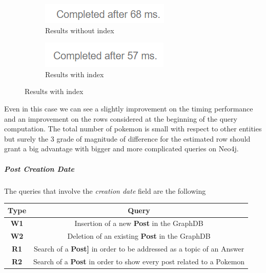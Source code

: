 \begin{figure}[H]
\begin{subfigure}{0.5\textwidth}
	\end{subfigure}
\end{figure}
\begin{figure}[H]
	\begin{subfigure}{0.5\textwidth}
		\includegraphics[width=0.9\linewidth]{img/pokemon_without_index_2.png} 
		\caption{Results without index}
	\end{subfigure}
	\begin{subfigure}{0.5\textwidth}
		\includegraphics[width=0.9\linewidth]{img/pokemon_with_index_2.png}
		\caption{Results with index}
	\end{subfigure}
\end{figure}

Even in this case we can see a slightly improvement on the timing performance and an improvement on the rows considered at the beginning of the query computation. The total number of pokemon is small with respect to other entities but surely the 3 grade of magnitude of difference for the estimated row should grant a big advantage with bigger and more complicated queries on Neo4j.
\subparagraph{Post Creation Date}
The queries that involve the \textit{creation date} field are the following

\begin{center}
	\begin{tabular}{| c | c |} 
		\hline
		\textbf{Type} & \textbf{Query} \\ [0.5ex] 
		\hline
		\textbf{W1} & Insertion of a new \textbf{Post} in the GraphDB\\ 
		\hline
		\textbf{W2} & Deletion of an existing \textbf{Post} in the GraphDB \\
		\hline
		\textbf{R1} & Search of a \textbf{Post]} in order to be addressed as a topic of an Answer\\
		\hline
		\textbf{R2} & Search of a \textbf{Post} in order to show every post related to a Pokemon\\
		\hline
	\end{tabular}
\end{center}

